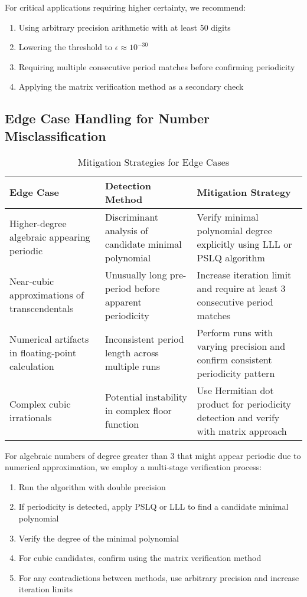 For critical applications requiring higher certainty, we recommend:
\begin{enumerate}
\item Using arbitrary precision arithmetic with at least 50 digits
\item Lowering the threshold to $\epsilon \approx 10^{-30}$
\item Requiring multiple consecutive period matches before confirming periodicity
\item Applying the matrix verification method as a secondary check
\end{enumerate}

\subsection{Edge Case Handling for Number Misclassification}

\begin{table}[htbp]
\centering
\caption{Mitigation Strategies for Edge Cases}
\label{tab:edge_case_mitigation}
\begin{tabular}{|p{3cm}|p{4cm}|p{6cm}|}
\hline
\textbf{Edge Case} & \textbf{Detection Method} & \textbf{Mitigation Strategy} \\
\hline
Higher-degree algebraic appearing periodic & Discriminant analysis of candidate minimal polynomial & Verify minimal polynomial degree explicitly using LLL or PSLQ algorithm \\
\hline
Near-cubic approximations of transcendentals & Unusually long pre-period before apparent periodicity & Increase iteration limit and require at least 3 consecutive period matches \\
\hline
Numerical artifacts in floating-point calculation & Inconsistent period length across multiple runs & Perform runs with varying precision and confirm consistent periodicity pattern \\
\hline
Complex cubic irrationals & Potential instability in complex floor function & Use Hermitian dot product for periodicity detection and verify with matrix approach \\
\hline
\end{tabular}
\end{table}

For algebraic numbers of degree greater than 3 that might appear periodic due to numerical approximation, we employ a multi-stage verification process:
\begin{enumerate}
\item Run the \HAPD{} algorithm with double precision
\item If periodicity is detected, apply PSLQ or LLL to find a candidate minimal polynomial
\item Verify the degree of the minimal polynomial
\item For cubic candidates, confirm using the matrix verification method
\item For any contradictions between methods, use arbitrary precision and increase iteration limits
\end{enumerate}

